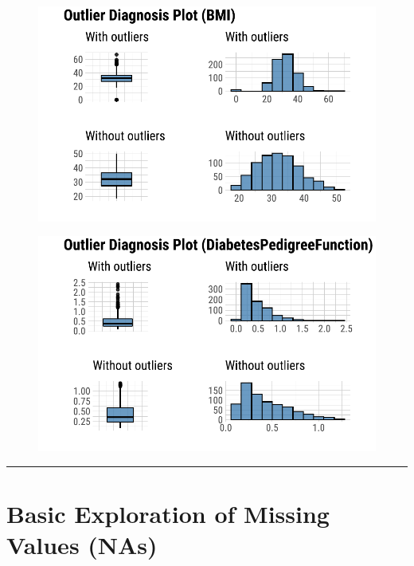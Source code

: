 \documentclass[
  letterpaper,
  DIV=11,
  numbers=noendperiod]{scrreprt}
\begin{document}
\begin{figure}[H]

{\centering \includegraphics{./ImputatingLikeDataScientist_files/figure-pdf/unnamed-chunk-5-1.pdf}

}

\end{figure}

\begin{figure}[H]

{\centering \includegraphics{./ImputatingLikeDataScientist_files/figure-pdf/unnamed-chunk-5-2.pdf}

}

\end{figure}

\begin{center}\rule{0.5\linewidth}{0.5pt}\end{center}

\hypertarget{basic-exploration-of-missing-values-nas}{%
\section{Basic Exploration of Missing Values
(NAs)}\label{basic-exploration-of-missing-values-nas}}
\end{document}
